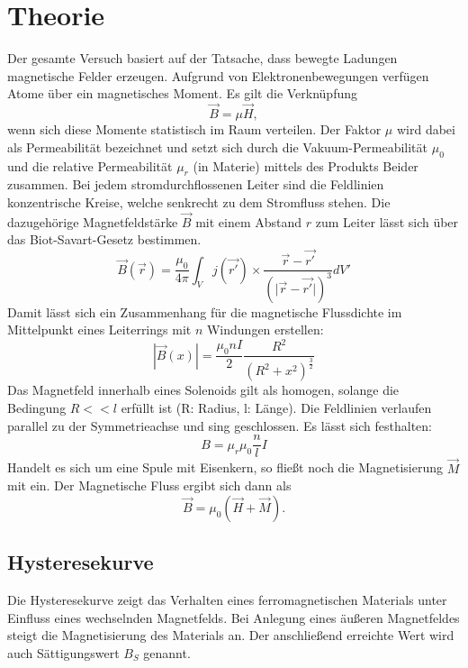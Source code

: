 \section{Theorie}
\label{sec:Theorie}

Der gesamte Versuch basiert auf der Tatsache, dass bewegte Ladungen magnetische 
Felder erzeugen. Aufgrund von Elektronenbewegungen verfügen Atome über ein 
magnetisches Moment. Es gilt die Verknüpfung
\begin{equation}
    \label{eqn:1}
    \vec{B} = \mu \vec{H},
\end{equation}
wenn sich diese Momente statistisch im Raum verteilen. Der Faktor $\mu$ wird 
dabei als Permeabilität bezeichnet und setzt sich durch die Vakuum-Permeabilität
$\mu_0$ und die relative Permeabilität $\mu_r$ (in Materie) mittels des Produkts
Beider zusammen.
Bei jedem stromdurchflossenen Leiter sind die Feldlinien konzentrische Kreise, 
welche senkrecht zu dem Stromfluss stehen. Die dazugehörige Magnetfeldstärke 
$\vec{B}$ mit einem Abstand $r$ zum Leiter lässt sich über das Biot-Savart-Gesetz
bestimmen.
\begin{equation}
    \label{eqn:2}
    \vec{B}(\vec{r}) = \frac{\mu_0}{4 \pi}
        \int_V j(\vec{r'}) \times \frac{\vec{r}-\vec{r'}}{(\lvert \vec{r}- \vec{r'} \rvert)^3} dV'
\end{equation}
Damit lässt sich ein Zusammenhang für die magnetische Flussdichte im Mittelpunkt 
eines Leiterrings mit $n$ Windungen erstellen:
\begin{equation}
    \label{eqn:3}
    |\vec{B}(x)| = \frac{\mu_0 n I}{2} \frac{R^2}{(R^2+x^2)^{\frac{3}{2}}}
\end{equation}
Das Magnetfeld innerhalb eines Solenoids gilt als homogen, solange die Bedingung 
$R<<l$ erfüllt ist (R: Radius, l: Länge). Die Feldlinien verlaufen parallel zu 
der Symmetrieachse und sing geschlossen. Es lässt sich festhalten:
\begin{equation}
    \label{eqn:4}
    B = \mu_r \mu_0 \frac{n}{l} I
\end{equation}
Handelt es sich um eine Spule mit Eisenkern, so fließt noch die Magnetisierung 
$\vec{M}$ mit ein. Der Magnetische Fluss ergibt sich dann als 
\begin{equation}
    \vec{B} = \mu_0 (\vec{H} + \vec{M}).
\end{equation}

\subsection{Hysteresekurve}
Die Hysteresekurve zeigt das Verhalten eines ferromagnetischen Materials unter
Einfluss eines wechselnden Magnetfelds. Bei Anlegung eines äußeren Magnetfeldes 
steigt die Magnetisierung des Materials an. Der anschließend erreichte Wert wird
auch Sättigungswert $B_S$ genannt.

